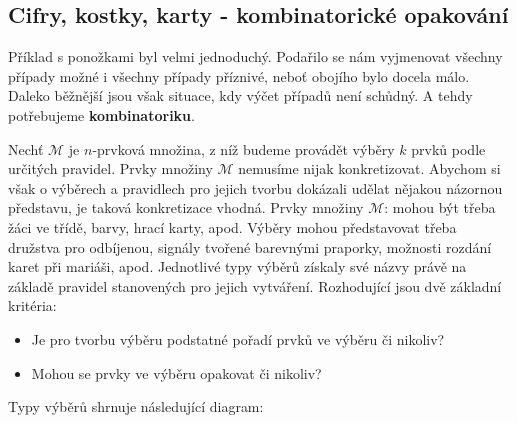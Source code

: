       
    \subsection{Cifry, kostky, karty - kombinatorické opakování}\label{mai:IchapIVsecIIssecII}
      Příklad s ponožkami byl velmi jednoduchý. Podařilo se nám vyjmenovat všechny případy možné i 
      všechny případy příznivé, neboť obojího bylo docela málo. Daleko běžnější jsou však situace, 
      kdy výčet případů není schůdný. A tehdy potřebujeme \textbf{kombinatoriku}.
      
      Nechť \(\mathcal{M}\) je \(n\)-prvková množina, z níž budeme provádět výběry \(k\) prvků 
      podle určitých pravidel. Prvky množiny \(\mathcal{M}\) nemusíme nijak konkretizovat. Abychom 
      si však o výběrech a pravidlech pro jejich tvorbu dokázali udělat nějakou názornou představu, 
      je taková konkretizace vhodná. Prvky množiny \(\mathcal{M}\): mohou být třeba žáci ve třídě, 
      barvy, hrací karty, apod. Výběry mohou představovat třeba družstva pro odbíjenou, signály 
      tvořené barevnými praporky, možnosti rozdání karet při mariáši, apod. Jednotlivé typy výběrů 
      získaly své názvy právě na základě pravidel stanovených pro jejich vytváření. Rozhodující 
      jsou dvě základní kritéria:
      \begin{itemize}[noitemsep]
        \item Je pro tvorbu výběru podstatné pořadí prvků ve výběru či nikoliv?
        \item Mohou se prvky ve výběru opakovat či nikoliv?
      \end{itemize}
      
      Typy výběrů shrnuje následující diagram:

